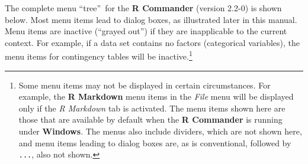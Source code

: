 \documentclass{article}%
\begin{document}
The complete menu \textquotedblleft tree\textquotedblright\ for the \textbf{R
Commander} (version 2.2-0) is shown below. Most menu items lead to dialog
boxes, as illustrated later in this manual. Menu items are inactive
(\textquotedblleft grayed out\textquotedblright) if they are inapplicable to
the current context. For example, if a data set contains no factors
(categorical variables), the menu items for contingency tables will be
inactive.\footnote{Some menu items may not be displayed in certain
circumstances. For example, the \textbf{R Markdown} menu items in the
\emph{File} menu will be displayed only if the \emph{R Markdown} tab is
activated. The menu items shown here are those that are available by default
when the \textbf{R Commander} is running under \textbf{Windows}. The menus
also include dividers, which are not shown here, and menu items leading to
dialog boxes are, as is conventional, followed by \texttt{...}, also not
shown.}
\end{document}
